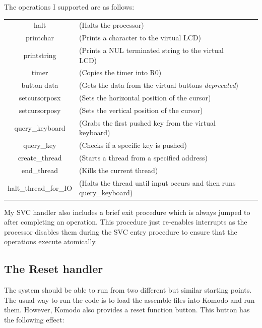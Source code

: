 The operations I supported are as follows:

\begin{tabular}{cl cl}
	halt & (Halts the processor) \\
	printchar & (Prints a character to the virtual LCD) \\
	printstring & (Prints a NUL terminated string to the virtual LCD) \\
	timer & (Copies the timer into R0) \\
	button data  & (Gets the data from the virtual buttons \textit{deprecated}) \\
	setcursorposx & (Sets the horizontal position of the cursor) \\
	setcursorposy & (Sets the vertical position of the cursor) \\
	query\_keyboard & (Grabs the first pushed key from the virtual keyboard) \\
	query\_key & (Checks if a specific key is pushed) \\
	create\_thread & (Starts a thread from a specified address) \\
	end\_thread & (Kills the current thread) \\
	halt\_thread\_for\_IO & (Halts the thread until input occurs and then runs query\_keyboard) \\
\end{tabular} 
\bigskip

My SVC handler also includes a brief exit procedure which is always jumped to after completing an operation. This procedure just re-enables interrupts as the processor disables them during the SVC entry procedure to ensure that the operations execute atomically. 
\subsection{The Reset handler}
The system should be able to run from two different but similar starting points. The usual way to run the code is to load the assemble files into Komodo and run them. However, Komodo also provides a reset function button. This button has the following effect:


